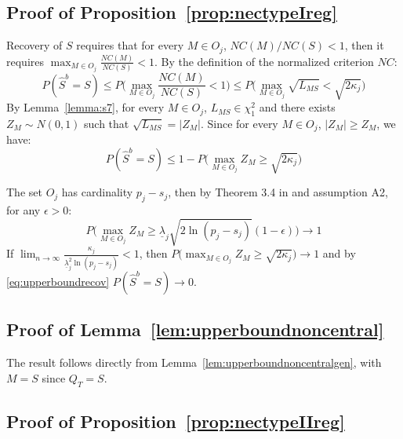 \documentclass[aos]{imsart}
\theoremstyle{plain}
\begin{document}
\subsection{Proof of Proposition~\ref{prop:nectypeIreg}}

Recovery of $S$ requires that for every $M\in O_j$, $NC(M)/NC(S)<1$, then it requires $\max_{M\in O_j}\frac{NC(M)}{NC(S)}<1$. By the definition of the normalized criterion $NC$:
$$P(\hat{S}^b=S) \leq P\Big(\max_{M\in O_j}\frac{NC(M)}{NC(S)}<1\Big)\leq  P\big(\max_{M\in O_j}\sqrt{L_{MS}}<\sqrt{2\kappa_j}\Big)$$
By Lemma~\ref{lemma:s7}, for every $M\in O_j$, $L_{MS}\in \chi^2_1$ and there exists $Z_M\sim N(0,1)$ such that $\sqrt{L_{MS}}=|Z_M|$. Since for every $M\in O_j$, $|Z_M|\geq Z_M$, we have:
\begin{equation}\label{eq:upperboundrecov}
    P(\hat{S}^b=S) \leq  1-P\big(\max_{M\in O_j}Z_M\geq\sqrt{2\kappa_j}\Big)
\end{equation}

The set $O_j$ has cardinality $p_j-s_j$, then by Theorem 3.4 in \cite{hartigan} and assumption A2, for any $\epsilon>0$:
$$P\big(\max_{M\in O_j}Z_M \geq \underline{\lambda}_j \sqrt{2 \ln(p_j-s_j)}(1-\epsilon)\big) \to 1$$
If $\lim_{n\to\infty}\frac{\kappa_j}{\underline{\lambda}_j^2\ln(p_j-s_j)} <1$, then $P\big(\max_{M\in O_j}Z_M\geq\sqrt{2\kappa_j}\big) \to 1$ and by \eqref{eq:upperboundrecov} $P(\hat{S}^b=S) \to 0$.

\subsection{Proof of Lemma~\ref{lem:upperboundnoncentral}}
The result follows directly from Lemma~\ref{lem:upperboundnoncentralgen}, with $M=S$ since $Q_T=S$.

\subsection{Proof of Proposition~\ref{prop:nectypeIIreg}}
\end{document}

